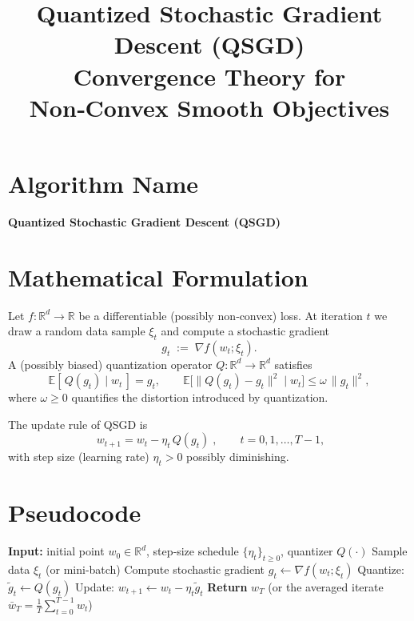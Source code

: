 \documentclass[11pt]{article}
\newcommand{\E}{\mathbb{E}}
\begin{document}
\title{Quantized Stochastic Gradient Descent (QSGD)\\
Convergence Theory for Non‑Convex Smooth Objectives}
\author{}
\date{}
\maketitle

\tableofcontents
\newpage

\section*{Algorithm Name}
\begin{center}
\textbf{Quantized Stochastic Gradient Descent (QSGD)}
\end{center}
\section*{Mathematical Formulation}
Let $f:\mathbb{R}^{d}\rightarrow\mathbb{R}$ be a differentiable (possibly non‑convex) loss.  
At iteration $t$ we draw a random data sample $\xi_t$ and compute a stochastic gradient
\[
g_t \;:=\; \nabla f(w_t;\xi_t).
\]
A (possibly biased) quantization operator $Q:\mathbb{R}^{d}\rightarrow\mathbb{R}^{d}$ satisfies  
\[
\E[\,Q(g_t)\mid w_t\,]=g_t ,\qquad 
\E\bigl[\|Q(g_t)-g_t\|^{2}\mid w_t\bigr]\le \omega\,\|g_t\|^{2},
\tag{1}
\]
where $\omega\ge 0$ quantifies the distortion introduced by quantization.

The update rule of QSGD is
\[
\boxed{ \; w_{t+1}=w_t-\eta_t\,Q(g_t) \; }, \qquad t=0,1,\dots,T-1,
\tag{2}
\]
with step size (learning rate) $\eta_t>0$ possibly diminishing.

\section*{Pseudocode}
\begin{algorithm}[H]
\caption{Quantized Stochastic Gradient Descent (QSGD)}
\begin{algorithmic}[1]
\State \textbf{Input:} initial point $w_0\in\mathbb{R}^{d}$, step‑size schedule $\{\eta_t\}_{t\ge0}$, quantizer $Q(\cdot)$
    \State Sample data $\xi_t$ (or mini‑batch)  
    \State Compute stochastic gradient $g_t \gets \nabla f(w_t;\xi_t)$
    \State Quantize: $\tilde g_t \gets Q(g_t)$
    \State Update: $w_{t+1} \gets w_t - \eta_t \tilde g_t$
\EndFor
\State \textbf{Return} $w_T$ (or the averaged iterate $\bar w_T=\frac1T\sum_{t=0}^{T-1} w_t$)
\end{algorithmic}
\end{algorithm}
\end{document}

